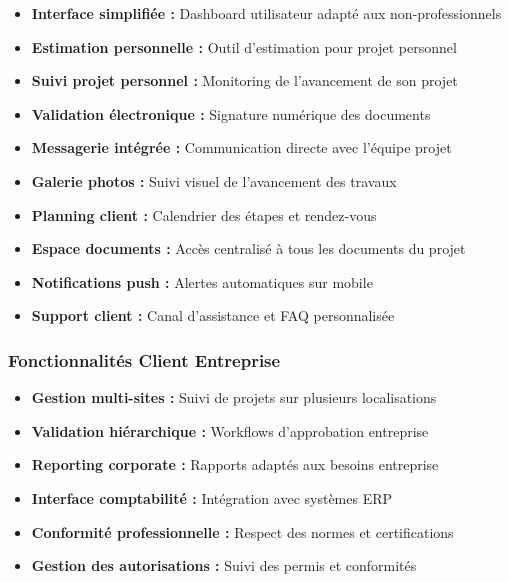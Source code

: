 \begin{itemize}
    \item \textbf{Interface simplifiée :} Dashboard utilisateur adapté aux non-professionnels
    \item \textbf{Estimation personnelle :} Outil d'estimation pour projet personnel
    \item \textbf{Suivi projet personnel :} Monitoring de l'avancement de son projet
    \item \textbf{Validation électronique :} Signature numérique des documents
    \item \textbf{Messagerie intégrée :} Communication directe avec l'équipe projet
    \item \textbf{Galerie photos :} Suivi visuel de l'avancement des travaux
    \item \textbf{Planning client :} Calendrier des étapes et rendez-vous
    \item \textbf{Espace documents :} Accès centralisé à tous les documents du projet
    \item \textbf{Notifications push :} Alertes automatiques sur mobile
    \item \textbf{Support client :} Canal d'assistance et FAQ personnalisée
\end{itemize}

\subsubsection{Fonctionnalités Client Entreprise}

\begin{itemize}
    \item \textbf{Gestion multi-sites :} Suivi de projets sur plusieurs localisations
    \item \textbf{Validation hiérarchique :} Workflows d'approbation entreprise
    \item \textbf{Reporting corporate :} Rapports adaptés aux besoins entreprise
    \item \textbf{Interface comptabilité :} Intégration avec systèmes ERP
    \item \textbf{Conformité professionnelle :} Respect des normes et certifications
    \item \textbf{Gestion des autorisations :} Suivi des permis et conformités
\end{itemize}


